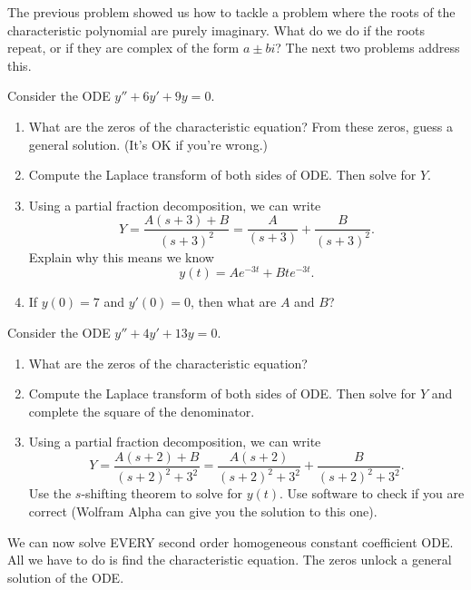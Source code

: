 The previous problem showed us how to tackle a problem where the roots of the characteristic polynomial are purely imaginary. What do we do if the roots repeat, or if they are complex of the form $a\pm bi$?  The next two problems address this.  

\begin{problem}
 Consider the ODE $y''+6y'+9y=0$.  
\begin{enumerate}
 \item What are the zeros of the characteristic equation? From these zeros, guess a general solution. (It's OK if you're wrong.)
 \item Compute the Laplace transform of both sides of ODE. Then solve for $Y$. 
 \item Using a partial fraction decomposition, we can write 
$$Y = \dfrac{A(s+3)+B}{(s+3)^2} =  \frac{A}{(s+3)}+\frac{B}{(s+3)^2}. $$
Explain why this means we know $$y(t) = Ae^{-3t}+Bte^{-3t}.$$ 
 \item If $y(0)=7$ and $y'(0)=0$, then what are $A$ and $B$?
\end{enumerate}
\end{problem}

\begin{problem}
 Consider the ODE $y''+4y'+13y=0$.  
\begin{enumerate}
 \item What are the zeros of the characteristic equation?
 \item Compute the Laplace transform of both sides of ODE. Then solve for $Y$ and complete the square of the denominator. 
 \item Using a partial fraction decomposition, we can write
$$Y = \frac{A(s+2)+B}{(s+2)^2+3^2} = \frac{A(s+2)}{(s+2)^2+3^2} +  \frac{B}{(s+2)^2+3^2}. $$
Use the $s$-shifting theorem to solve for $y(t)$. Use software to check if you are correct (Wolfram Alpha can give you the solution to this one).  
\end{enumerate}
\end{problem}


We can now solve EVERY second order homogeneous constant coefficient ODE.  All we have to do is find the characteristic equation. The zeros unlock a general solution of the ODE.


